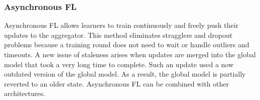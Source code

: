 \subsubsection{Asynchronous FL}
Asynchronous FL allows learners to train continuously and freely push their updates to the aggregator.
This method eliminates stragglers and dropout problems because a training round does not need to wait or handle outliers and timeouts.
A new issue of staleness arises when updates are merged into the global model that took a very long time to complete.
Such an update used a now outdated version of the global model.
As a result, the global model is partially reverted to an older state.
Asynchronous FL can be combined with other architectures. \cite{book:fl}